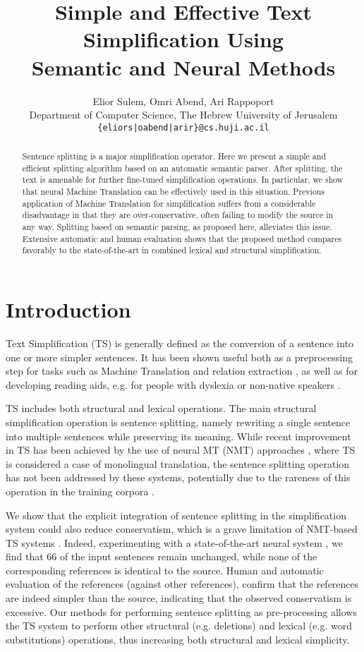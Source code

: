 \documentclass[11pt,a4paper]{article}
\title{Simple and Effective Text Simplification Using\\
Semantic and Neural Methods}
\author{Elior Sulem, Omri Abend, Ari Rappoport \\
Department of Computer Science, The Hebrew University of Jerusalem\\
{\tt \{eliors|oabend|arir\}@cs.huji.ac.il}
}
\date{}
\begin{document}
\maketitle
\begin{abstract}
Sentence splitting is a major simplification operator. Here we present a simple and efficient splitting algorithm based on an automatic semantic parser. After splitting, the text is amenable for further fine-tuned simplification operations. In particular, we show that neural Machine Translation can be effectively used in this situation.
Previous application of Machine Translation for simplification suffers from a considerable disadvantage in that they are over-conservative, often failing to modify the source in any way. Splitting based on semantic parsing, as proposed here, alleviates this issue. 
Extensive automatic and human evaluation shows that the proposed method compares favorably to the state-of-the-art in combined lexical and structural simplification.

\end{abstract}

\section{Introduction} \label{sec:introduction}

Text Simplification (TS) is generally defined as the conversion of a sentence into one or more simpler sentences. 
It has been shown useful both as a preprocessing step for tasks such as Machine Translation \citep[MT;][]{M14,SP16} 
and relation extraction \citep{N16}, as well as for developing reading aids, e.g. for people with dyslexia \citep{R13} or non-native speakers \citep{S02}.

TS includes both structural and lexical operations. The main structural simplification operation is sentence splitting, namely 
rewriting a single sentence into multiple sentences while preserving its meaning.
While recent improvement in TS has been achieved by the use of neural MT (NMT) approaches \citep{Ni17,Z17,ZL17}, where TS is considered a case of monolingual translation, the sentence splitting operation has not been addressed by these systems, potentially due to the rareness of this operation in the training corpora \citep{NG14,Xu15}.

We show that the explicit integration of sentence splitting in the simplification system could also reduce conservatism, which is a grave limitation of NMT-based TS systems \citep{AM17}. Indeed, experimenting with a state-of-the-art neural system \citep{Ni17}, we find that 66 of the input sentences remain unchanged, while none of the corresponding references is identical to the source.
Human and automatic evaluation of the references (against other references), confirm that the references are indeed simpler than the source,
indicating that the observed conservatism is excessive. 
Our methods for performing sentence splitting as pre-processing allows the TS system to perform other structural (e.g. deletions) and lexical (e.g. word substitutions) operations, thus increasing both structural and lexical simplicity.
\end{document}
